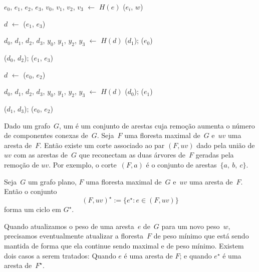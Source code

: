 \begin{algorithm}[htb]
\caption{\MSFupdate($G$, $e$, $w$)}
\label{Algo:MSFupdate}
\begin{algorithmic}[1]
\State $e_0$, $e_1$, $e_2$, $e_3$, $v_0$, $v_1$, $v_2$, $v_3$ $\gets$ $H(e)$
\State  \LCOAddCost($e_i$, $w$)
\EndFor

\label{Algo:MSFupdate:linha:if} 
\State $d$ $\gets$ \LCOMin($e_1$, $e_3$)\label{Algo:MSFupdate:linhamin}

\State $d_0$, $d_1$, $d_2$, $d_3$, $y_0$, $y_1$, $y_2$, $y_3$ $\gets$ $H(d)$
\label{Algo:MSFupdate:linha:compara}
\State \LCOSplit($d_1$); \LCOSplit($e_0$)\label{Algo:MSFupdate:linhasplit}

\State \LCOMerge($d_0$, $d_2$); \LCOMerge($e_1$, $e_3$)\label{Algo:MSFupdate:linhas:Merge}

\EndIf

\Else{}
\State $d$ $\gets$ \LCOMax($e_0$, $e_2$)\label{Algo:MSFupdate:dualinicio}

\State $d_0$, $d_1$, $d_2$, $d_3$, $y_0$, $y_1$, $y_2$, $y_3$ $\gets$ $H(d)$
\State \LCOSplit($d_0$); \LCOSplit($e_1$)

\State \LCOMerge($d_1$, $d_3$); \LCOMerge($e_0$, $e_2$)

\EndIf
\EndIf\label{Algo:MSFupdate:dualfim}
\end{algorithmic}
\end{algorithm}

Dado um grafo~$G$, um  é um conjunto de arestas cuja remoção aumenta o número de componentes conexas de~$G$.
Seja~$F$ uma floresta maximal de~$G$ e~$uv$ uma aresta de~$F$.
Então existe um corte associado ao par $(F, uv)$ dado pela união de $uv$ com as arestas de~$G$ que reconectam as duas árvores de~$F$ geradas pela remoção de $uv$.
Por exemplo, o corte~$(F, a)$ é o conjunto de arestas~$\{a,~b,~c\}$.

\begin{theorem}
\label{teo:cutset}
Seja~$G$ um grafo plano, $F$ uma floresta maximal de~$G$ e~$uv$ uma aresta de~$F$.
Então o conjunto
$$
(F, uv)^\star := \{e^\star:e\in (F, uv)\}
$$
forma um ciclo em $G^\star$.
\end{theorem}

Quando atualizamos o peso de uma aresta~$e$ de~$G$ para um novo peso~$w$, precisamos eventualmente atualizar a floresta~$F$ de peso mínimo que está sendo mantida de forma que ela continue sendo maximal e de peso mínimo.
Existem dois casos a serem tratados: Quando $e$ é uma aresta de $F$; e quando $e^\star$ é uma aresta de~$F^\star$.

